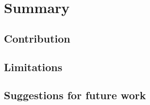 
\chapter{Summary}

\section{Contribution}

\section{Limitations}

\section{Suggestions for future work}

